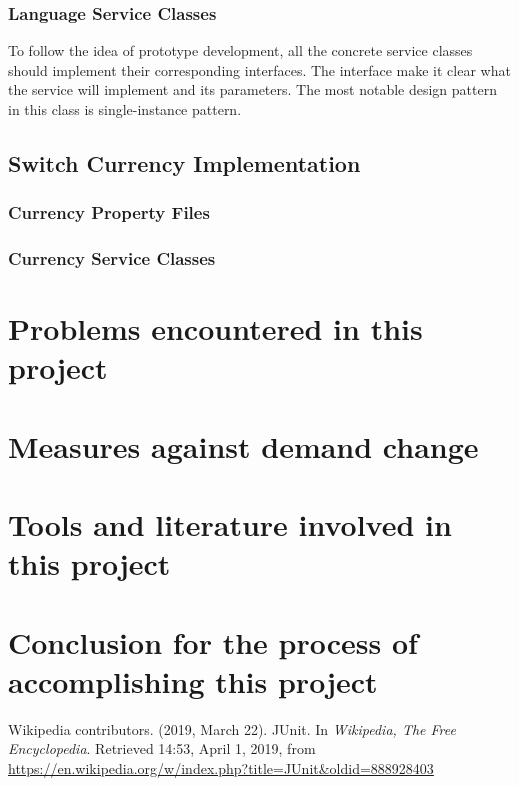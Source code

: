 \documentclass[a4paper]{report}
\begin{document}
\subsection{Language Service Classes }
\par To follow the idea of prototype development, all the concrete service classes should implement their corresponding interfaces. The interface make it clear what the service will implement and its parameters. The most notable design pattern in this class is single-instance pattern.

\section{Switch Currency Implementation}
\subsection{Currency Property Files}
\subsection{Currency Service Classes}


\chapter{Problems encountered in this project}


\chapter{Measures against demand change}



\chapter{Tools and literature involved in this project}



\chapter{Conclusion for the process of accomplishing this project}


\begin{thebibliography}{A}


Wikipedia contributors. (2019, March 22). JUnit. In \emph{Wikipedia, The Free Encyclopedia}. Retrieved 14:53, April 1, 2019, from \url{https://en.wikipedia.org/w/index.php?title=JUnit&oldid=888928403}

\end{thebibliography}
\end{document}
